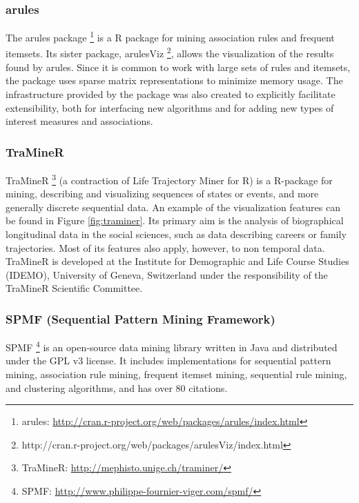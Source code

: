 \subsubsection*{arules}
The arules package \footnote{arules: \url{http://cran.r-project.org/web/packages/arules/index.html}} is a R package for mining association rules and frequent itemsets. Its sister package, arulesViz \footnote{http://cran.r-project.org/web/packages/arulesViz/index.html}, allows the visualization of the results found by arules. Since it is common to work with large sets of rules and itemsets, the package uses sparse matrix representations to minimize memory usage. The infrastructure provided by the package was also created to explicitly facilitate extensibility, both for interfacing new algorithms and for adding new types of interest measures and associations.

\subsubsection*{TraMineR}
TraMineR \footnote{TraMineR: \url{http://mephisto.unige.ch/traminer/}} (a contraction of Life Trajectory Miner for R) is a R-package for mining, describing and visualizing sequences of states or events, and more generally discrete sequential data. An example of the visualization features can be found in Figure \ref{fig:traminer}. Its primary aim is the analysis of biographical longitudinal data in the social sciences, such as data describing careers or family trajectories. Most of its features also apply, however, to non temporal data. TraMineR is developed at the Institute for Demographic and Life Course Studies (IDEMO), University of Geneva, Switzerland under the responsibility of the TraMineR Scientific Committee. 


\subsubsection{SPMF (Sequential Pattern Mining Framework)}
SPMF \footnote{SPMF: \url{http://www.philippe-fournier-viger.com/spmf/}} is an open-source data mining library written in Java and distributed under the GPL v3 license. It includes implementations for sequential pattern mining, association rule mining, frequent itemset mining, sequential rule mining, and clustering algorithms, and has over 80 citations.

